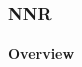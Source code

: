 \begin{frame}
	\frametitle{NNR}
		\framesubtitle{Overview}

		{\normalsize
		\hspace{0.5cm}{General Steps}\\
		}
		

\end{frame}
